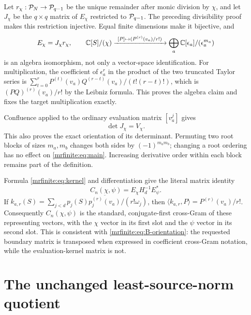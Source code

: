 \documentclass[11pt]{article}
\begin{document}
Let \(r_\chi:\mathcal P_N\to\mathcal P_{q-1}\) be the unique remainder after monic
division by \(\chi\), and let \(J_\chi\) be the \(q\times q\) matrix
of \(E_\chi\) restricted to \(\mathcal P_{q-1}\). The preceding divisibility
proof makes this restriction injective. Equal finite dimensions make it
bijective, and
\begin{equation}\label{mrfinite:eq:E-factor}
 E_\chi=J_\chi r_\chi,
 \qquad
 \mathbb C[S]/(\chi)\xrightarrow{\ [P]\mapsto(P^{(r)}(v_a)/r!)\ }
 \bigoplus_a\mathbb C[\epsilon_a]/(\epsilon_a^{m_a})
\end{equation}
is an algebra isomorphism, not only a vector-space identification.
For multiplication, the coefficient of \(\epsilon_a^r\) in the product
of the two truncated Taylor series is
\(\sum_{t=0}^r P^{(t)}(v_a)Q^{(r-t)}(v_a)/(t!(r-t)!)\), which is
\((PQ)^{(r)}(v_a)/r!\) by the Leibniz formula. This proves the algebra
claim and fixes the target multiplication exactly.

Confluence applied to the ordinary evaluation matrix
\([v_a^j]\) gives
\begin{equation}\label{mrfinite:eq:detJ}
 \det J_\chi=V_\chi.
\end{equation}
This also proves the exact orientation of its determinant. Permuting two
root blocks of sizes \(m_a,m_b\) changes both sides by
\((-1)^{m_am_b}\); changing a root ordering has no effect on
\eqref{mrfinite:eq:main}. Increasing derivative order within each block remains
part of the definition.

Formula \eqref{mrfinite:eq:kernel} and differentiation give the literal matrix
identity
\begin{equation}\label{mrfinite:eq:C-matrix}
 C_n(\chi,\psi)=E_\chi H_d^{-1}E_\psi^*.
\end{equation}
If \(k_{a,r}(S)=\sum_{j<d}p_j(S)
\overline{p_j^{(r)}(v_a)}/(r!\omega_j)\), then
\(\langle k_{a,r},P\rangle=P^{(r)}(v_a)/r!\).
Consequently \(C_n(\chi,\psi)\) is the standard, conjugate-first
cross-Gram of these representing vectors, with the \(\chi\) vector
in its first slot and the \(\psi\) vector in its second slot.
This is consistent with \eqref{mrfinite:eq:B-orientation}: the requested boundary
matrix is transposed when expressed in coefficient cross-Gram notation,
while the evaluation-kernel matrix is not.

\section{The unchanged least-source-norm quotient}\label{mrfinite:sec:quotient}
\end{document}
